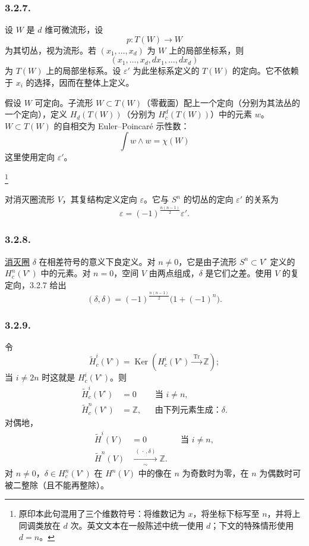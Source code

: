\subsubsection*{3.2.7.}
设 $W$ 是 $d$ 维可微流形，设
\[
p:T(W)\longrightarrow W
\]
为其切丛，视为流形。若 $(x_1,\ldots,x_d)$ 为 $W$ 上的局部坐标系，则
\[
(x_1,\ldots,x_d,dx_1,\ldots,dx_d)
\]
为 $T(W)$ 上的局部坐标系。设 $\varepsilon'$ 为此坐标系定义的 $T(W)$ 的定向。它不依赖于 $x_i$ 的选择，因而在整体上定义。

假设 $W$ 可定向。子流形 $W\subset T(W)$（零截面）配上一个定向（分别为其法丛的一个定向），定义 $H_d(T(W))$（分别为 $H_c^d(T(W))$）中的元素 $w$。$W\subset T(W)$ 的自相交为 Euler--Poincaré 示性数：
\[
\int w\wedge w=\chi(W)
\]
这里使用定向 $\varepsilon'$。

\footnote{原印本此句混用了三个维数符号：将维数记为 $x$，将坐标下标写至 $n$，并将上同调类放在 $d$ 次。英文文本在一般陈述中统一使用 $d$；下文的特殊情形使用 $d=n$。}

对消灭圈流形 $V$，其复结构定义定向 $\varepsilon$。它与 $S^n$ 的切丛的定向 $\varepsilon'$ 的关系为
\[
\varepsilon=(-1)^{\frac{n(n-1)}2}\varepsilon'.
\]

\subsubsection*{3.2.8.}
\underline{消灭圈} $\delta$ 在相差符号的意义下良定义。对 $n\ne0$，它是由子流形 $S^n\subset V^\circ$ 定义的 $H_c^n(V^\circ)$ 中的元素。对 $n=0$，空间 $V$ 由两点组成，$\delta$ 是它们之差。使用 $V$ 的复定向，3.2.7 给出
\begin{equation}\tag{3.2.8.1}
(\delta,\delta)
=(-1)^{\frac{n(n-1)}2}\bigl(1+(-1)^n\bigr).
\end{equation}

\subsubsection*{3.2.9.}
令
\[
\widetilde H_c^i(V^\circ)
=\operatorname{Ker}\!\left(
H_c^i(V^\circ)\xrightarrow{\ \operatorname{Tr}\ }\mathbb Z
\right);
\]
当 $i\ne2n$ 时这就是 $H_c^i(V^\circ)$。则
\[
\begin{aligned}
\widetilde H_c^i(V^\circ)&=0 &&\text{当 }i\ne n,\\
\widetilde H_c^n(V^\circ)&=\mathbb Z,
  &&\text{由下列元素生成：}\delta.
\end{aligned}
\]
对偶地，
\[
\begin{aligned}
\widetilde H^i(V)&=0 &&\text{当 }i\ne n,\\
\widetilde H^n(V)&\xrightarrow[\sim]{\ (\,\cdot\,,\delta)\ }\mathbb Z.
\end{aligned}
\]
对 $n\ne0$，$\delta\in H_c^n(V^\circ)$ 在 $H^n(V)$ 中的像在 $n$ 为奇数时为零，在 $n$ 为偶数时可被二整除（且不能再整除）。
